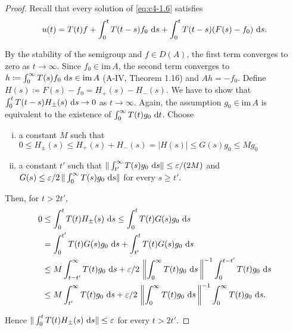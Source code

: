 \begin{proof}
Recall that every solution of \ref{eq:c4-1.6} satisfies
\begin{equation}\label{eq:c4-1.7}
u(t) = T(t)f + \int_{0}^{t} T(t-s)f_{0} \, \mathop{}\!\mathrm{d}{s} + \int_{0}^{t} T(t-s)(F(s) - f_{0}) \, \mathop{}\!\mathrm{d}{s}.
\end{equation}

By the stability of the semigroup and $f \in D(A)$, the first term converges to zero as $t \to \infty$.
Since $f_{0} \in \text{im} \, A$, the second term converges to $h \coloneqq  \int_{0}^{\infty} T(s)f_{0} \, \mathop{}\!\mathrm{d}{s} \in \text{im} \, A$ (A-IV, Theorem 1.16) and $Ah = -f_{0}$.
Define $H(s) \coloneqq F(s) - f_{0} = H_{+}(s) - H_{-}(s)$.
We have to show that $\int_{0}^{t} T(t-s)H_{\pm}(s) \, \mathop{}\!\mathrm{d}{s} \to 0$ as $t \to \infty$.
Again, the assumption $g_{0} \in \text{im}\, A$ is equivalent to the existence of $\int_{0}^{\infty} T(t)g_{0} \, \mathop{}\!\mathrm{d}{t}$.
Choose

\begin{enumerate}[(i)]
\item \label{prop:c4-1.11-1}
a constant $M$ such that\\
$0 \leq H_{\pm}(s) \leq H_{+}(s) + H_{-}(s) = |H(s)| \leq G(s)g_{0} \leq Mg_{0}$
\item \label{prop:c4-1.11-2}
a constant $t'$ such that $\|\int_{t'}^{\infty} T(s)g_{0} \, \mathop{}\!\mathrm{d}{s}\| \leq \varepsilon/(2M)$ and\\ $G(s) \leq \varepsilon/2 \, \|\int_{0}^{\infty} T(s)g_{0} \, \mathop{}\!\mathrm{d}{s}\|$ for every $s \geq t'$.
\end{enumerate}

Then, for $t > 2t'$,
\begin{align*}
0 &\leq \int_{0}^{t} T(t)H_{\pm}(s) \, \ds \leq \int_{0}^{t} T(t)G(s)g_{0} \, \ds\\
&= \int_{0}^{t'} T(t)G(s)g_{0} \, \ds + \int_{t'}^{t} T(t)G(s)g_{0} \, \ds\\
&\leq M \int_{t-t'}^{\infty} T(t)g_{0} \, \ds + \varepsilon/2 \, \left\|\int_{0}^{\infty} T(t)g_{0} \, \ds\, \right\|^{-1} \int_{0}^{t-t'} T(t)g_{0} \, \ds\\
&\leq M \int_{t'}^{\infty} T(t)g_{0} \, \ds + \varepsilon/2 \, \left\|\int_{0}^{\infty} T(t)g_{0} \, \ds\, \right\|^{-1} \int_{0}^{\infty} T(t)g_{0} \, \ds.
\end{align*}

Hence $\|\int_{0}^{t} T(t)H_{\pm}(s) \, \mathop{}\!\mathrm{d}{s}\| \leq \varepsilon$ for every $t > 2t'$.
\end{proof}

